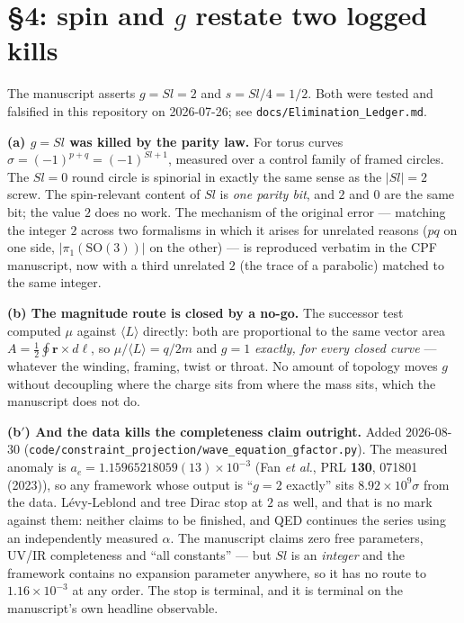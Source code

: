 \documentclass[11pt,a4paper]{article}
\newcommand{\Sl}{\mathit{Sl}}
\begin{document}
\section{\S4: spin and $g$ restate two logged kills}
\label{sec:spin}

The manuscript asserts $g = \Sl = 2$ and $s = \Sl/4 = 1/2$. Both were tested and
falsified in this repository on 2026-07-26; see \texttt{docs/Elimination\_Ledger.md}.

\textbf{(a) $g=\Sl$ was killed by the parity law.} For torus curves
$\sigma = (-1)^{p+q} = (-1)^{\Sl+1}$, measured over a control family of framed
circles. The $\Sl=0$ round circle is spinorial in exactly the same sense as the
$|\Sl|=2$ screw. The spin-relevant content of $\Sl$ is \emph{one parity bit}, and
$2$ and $0$ are the same bit; the value $2$ does no work. The mechanism of the
original error --- matching the integer $2$ across two formalisms in which it arises
for unrelated reasons ($pq$ on one side, $|\pi_1(\mathrm{SO}(3))|$ on the other) ---
is reproduced verbatim in the CPF manuscript, now with a third unrelated $2$
(the trace of a parabolic) matched to the same integer.

\textbf{(b) The magnitude route is closed by a no-go.} The successor test computed
$\mu$ against $\langle L\rangle$ directly: both are proportional to the same vector
area $A=\tfrac12\oint\mathbf{r}\times d\bm{\ell}$, so $\mu/\langle L\rangle = q/2m$
and $g = 1$ \emph{exactly, for every closed curve} --- whatever the winding,
framing, twist or throat. No amount of topology moves $g$ without decoupling where
the charge sits from where the mass sits, which the manuscript does not do.

\textbf{(b$'$) And the data kills the completeness claim outright.} Added 2026-08-30
(\texttt{code/constraint\_projection/wave\_equation\_gfactor.py}). The measured
anomaly is $a_e = 1.15965218059(13)\times10^{-3}$ (Fan \emph{et al.}, PRL \textbf{130},
071801 (2023)), so any framework whose output is ``$g=2$ exactly'' sits
$8.92\times10^{9}\sigma$ from the data. Lévy-Leblond and tree Dirac stop at $2$ as well,
and that is no mark against them: neither claims to be finished, and QED continues the
series using an independently measured $\alpha$. The manuscript claims zero free
parameters, UV/IR completeness and ``all constants'' --- but $\Sl$ is an \emph{integer}
and the framework contains no expansion parameter anywhere, so it has no route to
$1.16\times10^{-3}$ at any order. The stop is terminal, and it is terminal on the
manuscript's own headline observable.
\end{document}
